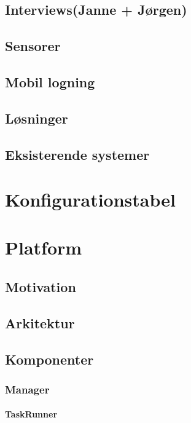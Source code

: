 \section{Interviews(Janne + Jørgen)}



\section{Sensorer}



\section{Mobil logning}

\section{Løsninger}

\section{Eksisterende systemer}


\chapter{Konfigurationstabel}
\chapter{Platform}
\section{Motivation} %
\section{Arkitektur}

\section{Komponenter}
\subsection{Manager}
\subsubsection{TaskRunner}
